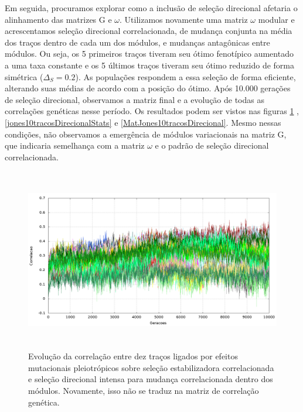 Em seguida, procuramos explorar como a inclusão de seleção direcional afetaria o
alinhamento das matrizes G e $\omega$. 
Utilizamos novamente uma matriz $\omega$ modular e acrescentamos seleção
direcional correlacionada, de mudança conjunta na média dos traços
dentro de cada um dos módulos, e mudanças antagônicas entre módulos. 
Ou seja, os 5 primeiros traços tiveram seu ótimo fenotípico aumentado a
uma taxa constante e os 5 últimos traços tiveram seu ótimo reduzido de
forma simétrica ($\Delta_S=0.2$). 
As populações respondem a essa seleção de forma eficiente, alterando
suas médias de acordo com a posição do ótimo. 
Após 10.000 gerações de seleção direcional, observamos a matriz final
e a evolução de todas as correlações genéticas nesse período. 
Os resultados podem ser vistos nas figuras \ref{jones10tracosDirecional}
, \ref{jones10tracosDirecionalStats} e \ref{MatJones10tracosDirecional}. 
Mesmo nessas condições, não observamos a emergência de módulos
variacionais na matriz G, que indicaria semelhança com a matriz $\omega$
e o padrão de seleção direcional correlacionada. 


\begin{figure}[htbp]
  \centering
  \includegraphics[width=150mm, height=80mm]{figuras/jones10tracosDirecional.png}
  \caption{Evolução da correlação entre dez traços ligados por efeitos
  mutacionais pleiotrópicos sobre seleção estabilizadora correlacionada
  e seleção direcional intensa para mudança correlacionada dentro dos
  módulos. Novamente, isso não se traduz na matriz de correlação genética.}
  \label{jones10tracosDirecional}
\end{figure}



